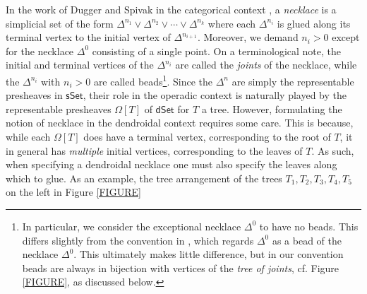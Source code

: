 \documentclass[a4paper,10pt]{article}%
\numberwithin{equation}{section}
\numberwithin{figure}{section}
\theoremstyle{definition} %
\begin{document}
In the work of Dugger and Spivak in the categorical context
\cite{DS11},
a \emph{necklace} is a simplicial set of the form
$\Delta^{n_1} \vee 
\Delta^{n_2} \vee \cdots \vee
\Delta^{n_k}$
where each $\Delta^{n_i}$ is glued along its terminal vertex to the initial vertex of $\Delta^{n_{i+1}}$.
Moreover, we demand $n_i > 0$
except for the necklace $\Delta^0$ consisting of a single point.
On a terminological note,
the initial and terminal vertices of the 
$\Delta^{n_i}$ are called the \emph{joints} of the necklace,
while the $\Delta^{n_i}$ with $n_i>0$ are called beads\footnote{In particular, 
we consider the exceptional necklace $\Delta^0$ to
have no beads.  
This differs slightly from the convention in \cite{DS11}, 
which regards $\Delta^0$ as a bead of the necklace $\Delta^0$. 
This ultimately makes little difference,
but in our convention beads are always in bijection with 
vertices of the \emph{tree of joints}, cf. Figure \ref{FIGURE},
as discussed below.}.
Since the $\Delta^n$ are simply the representable presheaves in 
$\mathsf{sSet}$,
their role in the operadic context is naturally played by the 
representable presheaves $\Omega[T]$ of $\mathsf{dSet}$
for $T$ a tree.
However, formulating the notion of necklace in the dendroidal context requires some care.
This is because, while each $\Omega[T]$ does have a terminal vertex, 
corresponding to the root of $T$, 
it in general has 
\emph{multiple} initial vertices, corresponding to the leaves
of $T$.
As such, when specifying a dendroidal necklace
one must also specify the leaves along which to glue.
As an example, the tree arrangement of the trees
$T_1,T_2,T_3,T_4,T_5$ on the left
in Figure \ref{FIGURE}
\end{document}
